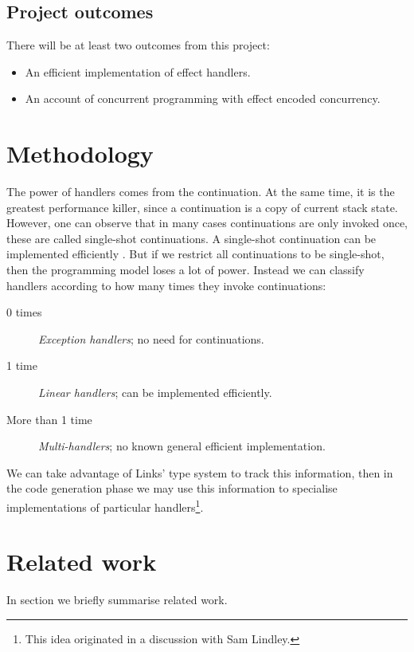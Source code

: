 \documentclass[preprint,10pt,numbers]{sigplanconf}
\begin{document}
\subsection{Project outcomes}
There will be at least two outcomes from this project:
\begin{itemize}
  \item An efficient implementation of effect handlers.
  \item An account of concurrent programming with effect encoded concurrency.  
\end{itemize}

\section{Methodology}
The power of handlers comes from the continuation. At the same time, it is the greatest performance killer, since a continuation is a copy of current stack state.
However, one can observe that in many cases continuations are only invoked once, these are called single-shot continuations. A single-shot continuation can be implemented efficiently \cite{Bruggeman1996}. But if we restrict all continuations to be single-shot, then the programming model loses a lot of power. Instead we can classify handlers according to how many times they invoke continuations: 
\begin{description}
  \item[0 times] \emph{Exception handlers}; no need for continuations.
  \item[1 time] \emph{Linear handlers}; can be implemented efficiently.
  \item[More than 1 time] \emph{Multi-handlers}; no known general efficient implementation.
\end{description}
We can take advantage of Links' type system to track this information, then in the code generation phase we may use this information to specialise implementations of particular handlers\footnote{This idea originated in a discussion with Sam Lindley.}.

  \section{Related work}\label{sec:relatedwork}
In section we briefly summarise related work.
\end{document}
